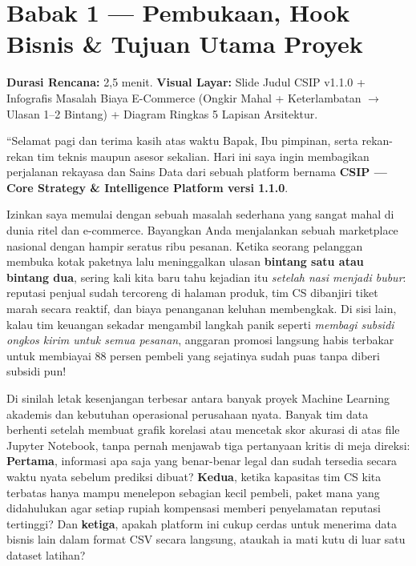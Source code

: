 \documentclass[11pt,a4paper,oneside]{book}
\begin{document}
\section{Babak 1 --- Pembukaan, Hook Bisnis \& Tujuan Utama Proyek}

\begin{stagebox}
\textbf{Durasi Rencana:} 2,5 menit. \quad \textbf{Visual Layar:} Slide Judul CSIP v1.1.0 + Infografis Masalah Biaya E-Commerce (Ongkir Mahal + Keterlambatan $\rightarrow$ Ulasan 1--2 Bintang) + Diagram Ringkas 5 Lapisan Arsitektur.
\end{stagebox}

\begin{scriptbox}
``Selamat pagi dan terima kasih atas waktu Bapak, Ibu pimpinan, serta rekan-rekan tim teknis maupun asesor sekalian. Hari ini saya ingin membagikan perjalanan rekayasa dan Sains Data dari sebuah platform bernama \textbf{CSIP --- Core Strategy \& Intelligence Platform versi 1.1.0}.

Izinkan saya memulai dengan sebuah masalah sederhana yang sangat mahal di dunia ritel dan e-commerce. Bayangkan Anda menjalankan sebuah marketplace nasional dengan hampir seratus ribu pesanan. Ketika seorang pelanggan membuka kotak paketnya lalu meninggalkan ulasan \textbf{bintang satu atau bintang dua}, sering kali kita baru tahu kejadian itu \emph{setelah nasi menjadi bubur}: reputasi penjual sudah tercoreng di halaman produk, tim CS dibanjiri tiket marah secara reaktif, dan biaya penanganan keluhan membengkak. Di sisi lain, kalau tim keuangan sekadar mengambil langkah panik seperti \emph{membagi subsidi ongkos kirim untuk semua pesanan}, anggaran promosi langsung habis terbakar untuk membiayai 88 persen pembeli yang sejatinya sudah puas tanpa diberi subsidi pun!

Di sinilah letak kesenjangan terbesar antara banyak proyek Machine Learning akademis dan kebutuhan operasional perusahaan nyata. Banyak tim data berhenti setelah membuat grafik korelasi atau mencetak skor akurasi di atas file Jupyter Notebook, tanpa pernah menjawab tiga pertanyaan kritis di meja direksi: \textbf{Pertama}, informasi apa saja yang benar-benar legal dan sudah tersedia secara waktu nyata sebelum prediksi dibuat? \textbf{Kedua}, ketika kapasitas tim CS kita terbatas hanya mampu menelepon sebagian kecil pembeli, paket mana yang didahulukan agar setiap rupiah kompensasi memberi penyelamatan reputasi tertinggi? Dan \textbf{ketiga}, apakah platform ini cukup cerdas untuk menerima data bisnis lain dalam format CSV secara langsung, ataukah ia mati kutu di luar satu dataset latihan?


\end{scriptbox}
\end{document}
